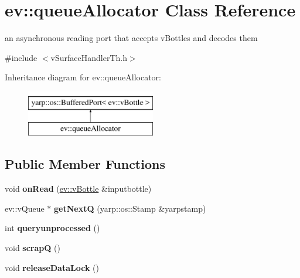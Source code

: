 \hypertarget{classev_1_1queueAllocator}{}\section{ev\+:\+:queue\+Allocator Class Reference}
\label{classev_1_1queueAllocator}


an asynchronous reading port that accepts v\+Bottles and decodes them  




{\ttfamily \#include $<$v\+Surface\+Handler\+Th.\+h$>$}

Inheritance diagram for ev\+:\+:queue\+Allocator\+:\begin{figure}[H]
\begin{center}
\leavevmode
\includegraphics[height=2.000000cm]{classev_1_1queueAllocator}
\end{center}
\end{figure}
\subsection*{Public Member Functions}
\begin{DoxyCompactItemize}
\item 
void {\bfseries on\+Read} (\hyperlink{classev_1_1vBottle}{ev\+::v\+Bottle} \&inputbottle)\hypertarget{classev_1_1queueAllocator_a12ae388a8d2deb71ca5b927c3eb0a860}{}\label{classev_1_1queueAllocator_a12ae388a8d2deb71ca5b927c3eb0a860}

\item 
ev\+::v\+Queue $\ast$ {\bfseries get\+NextQ} (yarp\+::os\+::\+Stamp \&yarpstamp)\hypertarget{classev_1_1queueAllocator_a2429870a8dd1a2e1b71853bdc7a50bde}{}\label{classev_1_1queueAllocator_a2429870a8dd1a2e1b71853bdc7a50bde}

\item 
int {\bfseries queryunprocessed} ()\hypertarget{classev_1_1queueAllocator_adb785d0d33ba16522f8846da35c7ebab}{}\label{classev_1_1queueAllocator_adb785d0d33ba16522f8846da35c7ebab}

\item 
void {\bfseries scrapQ} ()\hypertarget{classev_1_1queueAllocator_a1a914bc39f534dc50a7eb2ba846753bf}{}\label{classev_1_1queueAllocator_a1a914bc39f534dc50a7eb2ba846753bf}

\item 
void {\bfseries release\+Data\+Lock} ()\hypertarget{classev_1_1queueAllocator_aa3ab79f1da7f2930811ab980347b0305}{}\label{classev_1_1queueAllocator_aa3ab79f1da7f2930811ab980347b0305}

\end{DoxyCompactItemize}


